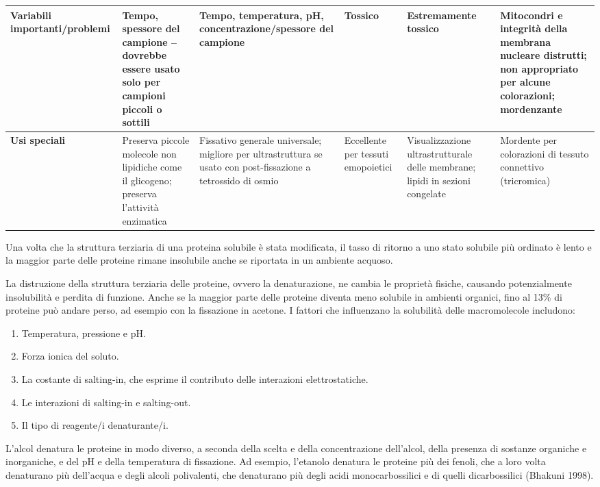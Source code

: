 \begin{landscape}
\begin{longtable}{|p{3.5cm}|p{3cm}|p{3.5cm}|p{3cm}|p{3cm}|p{3.5cm}|}
\textbf{Variabili importanti/problemi} & Tempo, spessore del campione – dovrebbe essere usato solo per campioni piccoli o sottili & Tempo, temperatura, pH, concentrazione/spessore del campione & Tossico & Estremamente tossico & Mitocondri e integrità della membrana nucleare distrutti; non appropriato per alcune colorazioni; mordenzante \\ \hline
\textbf{Usi speciali} & Preserva piccole molecole non lipidiche come il glicogeno; preserva l'attività enzimatica & Fissativo generale universale; migliore per ultrastruttura se usato con post-fissazione a tetrossido di osmio & Eccellente per tessuti emopoietici & Visualizzazione ultrastrutturale delle membrane; lipidi in sezioni congelate & Mordente per colorazioni di tessuto connettivo (tricromica) \\ \hline
\end{longtable}
\end{landscape}

\normalsize
Una volta che la struttura terziaria di una proteina solubile è stata modificata, il tasso di ritorno a uno stato solubile più ordinato è lento e la maggior parte delle proteine rimane insolubile anche se riportata in un ambiente acquoso. 

La distruzione della struttura terziaria delle proteine, ovvero la denaturazione, ne cambia le proprietà fisiche, causando potenzialmente insolubilità e perdita di funzione. Anche se la maggior parte delle proteine diventa meno solubile in ambienti organici, fino al 13\% di proteine può andare perso, ad esempio con la fissazione in acetone. I fattori che influenzano la solubilità delle macromolecole includono:
\begin{enumerate}
    \item Temperatura, pressione e pH.
    \item Forza ionica del soluto.
    \item La costante di salting-in, che esprime il contributo delle interazioni elettrostatiche.
    \item Le interazioni di salting-in e salting-out.
    \item Il tipo di reagente/i denaturante/i.
\end{enumerate}

L'alcol denatura le proteine in modo diverso, a seconda della scelta e della concentrazione dell'alcol, della presenza di sostanze organiche e inorganiche, e del pH e della temperatura di fissazione. Ad esempio, l'etanolo denatura le proteine più dei fenoli, che a loro volta denaturano più dell'acqua e degli alcoli polivalenti, che denaturano più degli acidi monocarbossilici e di quelli dicarbossilici (Bhakuni 1998).

